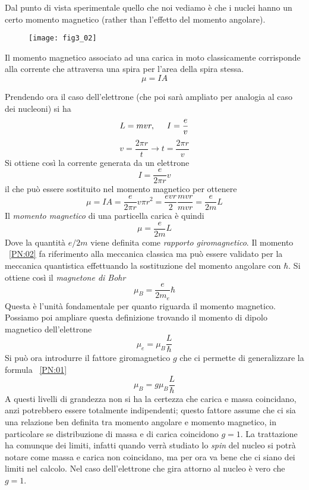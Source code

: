 Dal punto di vista sperimentale quello che noi vediamo è che i nuclei hanno un certo momento magnetico (rather than l'effetto del momento angolare).
\begin{figure}
\centering
\texttt{[image: fig3\_02]}
\end{figure}
Il momento magnetico associato ad una carica in moto classicamente corrisponde alla corrente che attraversa una spira per l'area della spira stessa.
\begin{equation}
\mu=IA
\end{equation}

Prendendo ora il caso dell'elettrone (che poi sarà ampliato per analogia al caso dei nucleoni) si ha 
\begin{equation}
L=mvr, \hspace{0.5cm}I=\frac{e}{v}
\end{equation}
\begin{equation}
v=\frac{2\pi r}{t}\to t=\frac{2\pi r}{v}
\end{equation}
Si ottiene così la corrente generata da un elettrone
\begin{equation}
I=\frac{e}{2\pi r}v
\end{equation}
il che può essere sostituito nel momento magnetico per ottenere
\begin{equation}
\mu=IA=\frac{e}{2\pi r}v\pi r^2=\frac{evr}{2}\frac{mvr}{mvr}=\frac{e}{2m}L
\end{equation}
Il \emph{momento magnetico} di una particella carica è quindi
\begin{equation}
\mu=\frac{e}{2m}L
\label{PN:02}
\end{equation}
Dove la quantità $e/2m$ viene definita come \emph{rapporto giromagnetico}. 
Il momento ~\eqref{PN:02} fa riferimento alla meccanica classica ma può essere validato per la meccanica quantistica effettuando la sostituzione del momento angolare con $\hbar$.
Si ottiene così il \emph{magnetone di Bohr}
\begin{equation}
\mu_B=\frac{e}{2m_e}\hbar
\end{equation}
Questa è l'unità fondamentale per quanto riguarda il momento magnetico.
Possiamo poi ampliare questa definizione trovando il momento di dipolo magnetico dell'elettrone
\begin{equation}
\mu_e =\mu_B \frac{L}{\hbar}
\label{PN:01}
\end{equation}
Si può ora introdurre il fattore giromagnetico $g$ che ci permette di generalizzare la formula ~\eqref{PN:01}
\begin{equation}
\mu_B =g\mu_B \frac{L}{\hbar}
\end{equation}
A questi livelli di grandezza non si ha la certezza che carica e massa coincidano, anzi potrebbero essere totalmente indipendenti; questo fattore assume che ci sia una relazione ben definita tra momento angolare e momento magnetico, in particolare se distribuzione di massa e di carica coincidono $g=1$.
La trattazione ha comunque dei limiti, infatti quando verrà studiato lo \emph{spin} del nucleo si potrà notare come massa e carica non coincidano, ma per ora va bene che ci siano dei limiti nel calcolo.
Nel caso dell'elettrone che gira attorno al nucleo è vero che $g=1$.

